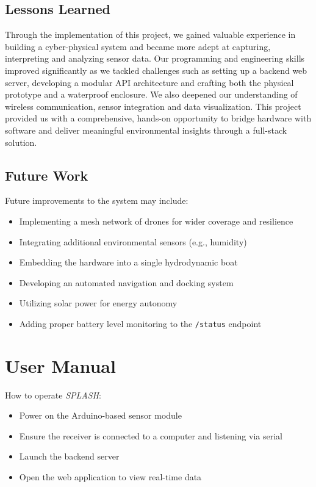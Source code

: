 \documentclass{article}
\begin{document}
    \subsection{Lessons Learned}
    Through the implementation of this project, we gained valuable experience in building a cyber-physical system and became more adept at capturing, interpreting and analyzing sensor data. Our programming and engineering skills improved significantly as we tackled challenges such as setting up a backend web server, developing a modular API architecture and crafting both the physical prototype and a waterproof enclosure. We also deepened our understanding of wireless communication, sensor integration and data visualization. This project provided us with a comprehensive, hands-on opportunity to bridge hardware with software and deliver meaningful environmental insights through a full-stack solution.
    \subsection{Future Work}
    Future improvements to the system may include:
    \begin{itemize}
        \item Implementing a mesh network of drones for wider coverage and resilience
        \item Integrating additional environmental sensors (e.g., humidity)
        \item Embedding the hardware into a single hydrodynamic boat
        \item Developing an automated navigation and docking system
        \item Utilizing solar power for energy autonomy
        \item Adding proper battery level monitoring to the \texttt{/status} endpoint
    \end{itemize}

\newpage
\appendix
\section{User Manual}
    How to operate \textit{SPLASH}:
    \begin{itemize}
        \item Power on the Arduino-based sensor module
        \item Ensure the receiver is connected to a computer and listening via serial
        \item Launch the backend server
        \item Open the web application to view real-time data
    \end{itemize}
\end{document}
